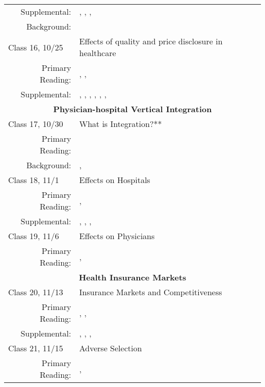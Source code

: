 \documentclass{article}
\begin{document}
\begin{longtable}{lp{11cm}}
          \multicolumn{1}{r}{Supplemental:} & \cite{farrell2007}, \cite{ketcham2012}, \cite{handel2013}, \cite{ericson2014} \\
          \multicolumn{1}{r}{Background:} &  \cite{dranove2010} \\
  \hline
  Class 16, 10/25 & Effects of quality and price disclosure in healthcare \\
          \multicolumn{1}{r}{Primary Reading:} & \cite{dranove2003more}, \cite{dafny2008}, \cite{cooper2018} \ \\
          \multicolumn{1}{r}{Supplemental:} &  \cite{chernew1998}, \cite{scanlon2002}, \cite{wedig2002}, \cite{jin2006}, \cite{reid2013}, \cite{darden2015}, \cite{mccarthy2017} \\

  \hline
  \multicolumn{2}{c}{\textbf{Physician-hospital Vertical Integration}} \\
  \hline\hline
  Class 17, 10/30 & What is Integration?** \\
          \multicolumn{1}{r}{Primary Reading:} & \cite{burns2002} \\
          \multicolumn{1}{r}{Background:} & \cite{kocher2011}, \cite{post2017}  \\
  \hline
  Class 18, 11/1 & Effects on Hospitals \\
          \multicolumn{1}{r}{Primary Reading:} & \cite{baker2014}, \cite{lin2017} \\
          \multicolumn{1}{r}{Supplemental:} & \cite{ciliberto2006}, \cite{cuellar2006}, \cite{neprash2015}, \cite{konetzka2018} \\
  \hline
  Class 19, 11/6 & Effects on Physicians \\
          \multicolumn{1}{r}{Primary Reading:} & \cite{baker2016}, \cite{koch2017} \\
  \hline
  \multicolumn{2}{c}{\textbf{Health Insurance Markets}} \\
  \hline\hline
  Class 20, 11/13 & Insurance Markets and Competitiveness \\
          \multicolumn{1}{r}{Primary Reading:} &  \cite{dafny2010}, \cite{dafny2012}, \cite{bundorf2012}  \\
          \multicolumn{1}{r}{Supplemental:} & \cite{town2003}, \cite{einav2010}, \cite{einav2010qje}, \cite{starc2014} \\
  \hline
  Class 21, 11/15 & Adverse Selection \\
          \multicolumn{1}{r}{Primary Reading:} & \cite{cutler1998},  \cite{decarolis2017} \\

\end{longtable}
\end{document}
